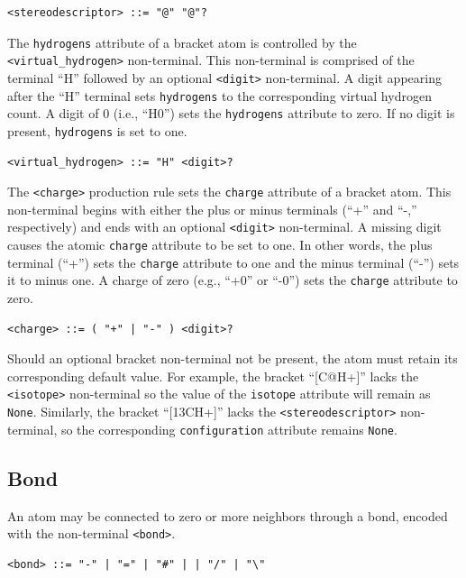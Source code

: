 \documentclass{article}
\def\ttt{\texttt}
\begin{document}
\begin{lstlisting}
<stereodescriptor> ::= "@" "@"?
\end{lstlisting}

The \ttt{hydrogens} attribute of a bracket atom is controlled by the \\ \ttt{<virtual{\_}hydrogen>} non-terminal. This non-terminal is comprised of the terminal \enquote{H} followed by an optional \ttt{<digit>} non-terminal. A digit appearing after the \enquote{H} terminal sets \ttt{hydrogens} to the corresponding virtual hydrogen count. A digit of 0 (i.e., \enquote{H0}) sets the \ttt{hydrogens} attribute to zero. If no digit is present, \ttt{hydrogens} is set to one.

\begin{lstlisting}
<virtual_hydrogen> ::= "H" <digit>?
\end{lstlisting}

The \ttt{<charge>} production rule sets the \ttt{charge} attribute of a bracket atom. This non-terminal begins with either the plus or minus terminals (\enquote{+} and \enquote{-,} respectively) and ends with an optional \ttt{<digit>} non-terminal. A missing digit causes the atomic \ttt{charge} attribute to be set to one. In other words, the plus terminal (\enquote{+}) sets the \ttt{charge} attribute to one and the minus terminal (\enquote{-}) sets it to minus one. A charge of zero (e.g., \enquote{+0} or \enquote{-0}) sets the \ttt{charge} attribute to zero.

\begin{lstlisting}
<charge> ::= ( "+" | "-" ) <digit>?
\end{lstlisting}

Should an optional bracket non-terminal not be present, the atom must retain its corresponding default value. For example, the bracket \enquote{[C@H+]} lacks the \ttt{<isotope>} non-terminal so the value of the \ttt{isotope} attribute will remain as \ttt{None}. Similarly, the bracket \enquote{[13CH+]} lacks the \ttt{<stereodescriptor>} non-terminal, so the corresponding \ttt{configuration} attribute remains \ttt{None}.

\subsection*{Bond}

An atom may be connected to zero or more neighbors through a bond, encoded with the non-terminal \ttt{<bond>}.

\begin{lstlisting}
<bond> ::= "-" | "=" | "#" | | "/" | "\"
\end{lstlisting}
\end{document}
